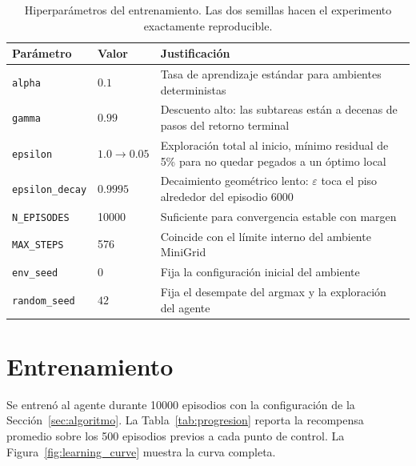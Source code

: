 \documentclass[11pt,a4paper]{article}
\begin{document}
\begin{table}[h]
  \centering
  \small
  \setlength{\extrarowheight}{2pt}
  \begin{tabularx}{\linewidth}{l l X}
    \toprule
    \textbf{Parámetro} & \textbf{Valor} & \textbf{Justificación} \\
    \midrule
    \texttt{alpha} & \(0.1\) & Tasa de aprendizaje estándar para ambientes deterministas \\
    \texttt{gamma} & \(0.99\) & Descuento alto: las subtareas están a decenas de pasos del retorno terminal \\
    \texttt{epsilon} & \(1.0 \to 0.05\) & Exploración total al inicio, mínimo residual de 5\% para no quedar pegados a un óptimo local \\
    \texttt{epsilon\_decay} & \(0.9995\) & Decaimiento geométrico lento: \(\varepsilon\) toca el piso alrededor del episodio \num{6000} \\
    \texttt{N\_EPISODES} & \num{10000} & Suficiente para convergencia estable con margen \\
    \texttt{MAX\_STEPS} & \num{576} & Coincide con el límite interno del ambiente MiniGrid \\
    \texttt{env\_seed} & \(0\) & Fija la configuración inicial del ambiente \\
    \texttt{random\_seed} & \(42\) & Fija el desempate del argmax y la exploración del agente \\
    \bottomrule
  \end{tabularx}
  \caption{Hiperparámetros del entrenamiento. Las dos semillas hacen el
  experimento exactamente reproducible.}
  \label{tab:hp}
\end{table}

\section{Entrenamiento}
\label{sec:entrenamiento}

Se entrenó al agente durante \num{10000} episodios con la configuración
de la Sección~\ref{sec:algoritmo}. La Tabla~\ref{tab:progresion}
reporta la recompensa promedio sobre los \num{500} episodios previos a
cada punto de control. La Figura~\ref{fig:learning_curve} muestra la
curva completa.
\end{document}
